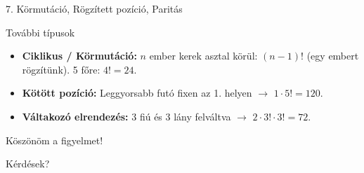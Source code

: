 \documentclass[aspectratio=169,11pt]{beamer}
\begin{document}
\begin{frame}{7. Körmutáció, Rögzített pozíció, Paritás}
    \begin{block}{További típusok}
        \begin{itemize}
            \item \textbf{Ciklikus / Körmutáció:} $n$ ember kerek asztal körül: $(n-1)!$ (egy embert rögzítünk). 5 főre: $4! = 24$.
            \item \textbf{Kötött pozíció:} Leggyorsabb futó fixen az 1. helyen $\rightarrow$ $1 \cdot 5! = 120$.
            \item \textbf{Váltakozó elrendezés:} 3 fiú és 3 lány felváltva $\rightarrow$ $2 \cdot 3! \cdot 3! = 72$.
        \end{itemize}
    \end{block}
\end{frame}

\begin{frame}{Köszönöm a figyelmet!}
    \begin{center}
        \Large Kérdések?
    \end{center}
\end{frame}
\end{document}

